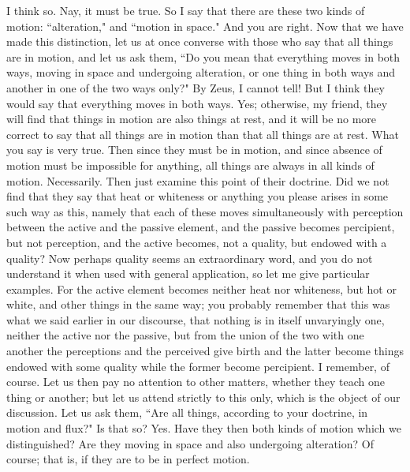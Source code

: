 \documentclass[letterpaper,12pt]{article}
\newcommand{\stephpag}[1]{\marginnote{\small\itshape\fontfamily{ppl}\selectfont #1}}
\begin{document}
\begin{drama}
\theodorusspeaks
I think so.
\socratesspeaks
Nay, it must be true. So I say that there are these two kinds of motion: ``alteration," and ``motion in space."
\theodorusspeaks
And you are right.
\socratesspeaks
Now that we have made this distinction, let us at once converse with those who say that all things are in motion, and let us ask them, ``Do you mean that everything moves in both ways, \stephpag{e} moving in space and undergoing alteration, or one thing in both ways and another in one of the two ways only?"
\theodorusspeaks
By Zeus, I cannot tell! But I think they would say that everything moves in both ways.
\socratesspeaks
Yes; otherwise, my friend, they will find that things in motion are also things at rest, and it will be no more correct to say that all things are in motion than that all things are at rest.
\theodorusspeaks
What you say is very true.
\socratesspeaks
Then since they must be in motion, and since absence of motion must be impossible for anything, all things are \stephpag{182 a} always in all kinds of motion.
\theodorusspeaks
Necessarily.
\socratesspeaks
Then just examine this point of their doctrine. Did we not find that they say that heat or whiteness or anything you please arises in some such way as this, namely that each of these moves simultaneously with perception between the active and the passive element, and the passive becomes percipient, but not perception, and the active becomes, not a quality, but endowed with a quality? Now perhaps quality seems an extraordinary word, and you do not understand it when used with general application, so let me give particular examples. \stephpag{b} For the active element becomes neither heat nor whiteness, but hot or white, and other things in the same way; you probably remember that this was what we said earlier in our discourse, that nothing is in itself unvaryingly one, neither the active nor the passive, but from the union of the two with one another the perceptions and the perceived give birth and the latter become things endowed with some quality while the former become percipient.
\theodorusspeaks
I remember, of course.
\socratesspeaks
Let us then pay no attention to other matters, whether they teach \stephpag{c} one thing or another; but let us attend strictly to this only, which is the object of our discussion. Let us ask them, ``Are all things, according to your doctrine, in motion and flux?" Is that so?
\theodorusspeaks
Yes.
\socratesspeaks
Have they then both kinds of motion which we distinguished? Are they moving in space and also undergoing alteration?
\theodorusspeaks
Of course; that is, if they are to be in perfect motion.

\end{drama}
\end{document}
